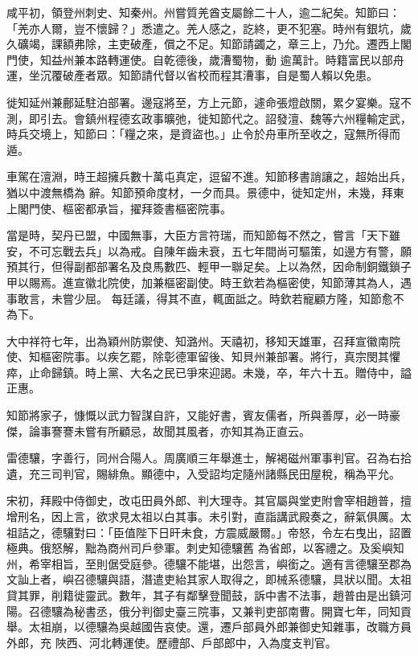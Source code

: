 \begin{pinyinscope}
 咸平初，領登州刺史、知秦州。州嘗質羌酋支屬餘二十人，逾二紀矣。知節曰：「羌亦人爾，豈不懷歸？」悉遣之。羌人感之，訖終，更不犯塞。時州有銀坑，歲久礦竭，課額弗除，主吏破產，償之不足。知節請蠲之，章三上，乃允。遷西上閣門使，知益州兼本路轉運使。自乾德後，歲漕蜀物，動
 逾萬計。時籍富民以部舟運，坐沉覆破產者眾。知節請代督以省校而程其漕事，自是蜀人賴以免患。



 徙知延州兼鄜延駐泊部署。邊寇將至，方上元節，遽命張燈啟關，累夕宴樂。寇不測，即引去。會鎮州程德玄政事曠弛，徙知節代之。詔發澶、魏等六州糧輸定武，時兵交境上，知節曰：「糧之來，是資盜也。」止令於舟車所至收之，寇無所得而遁。



 車駕在澶淵，時王超擁兵數十萬屯真定，逗留不進。知節移書誚讓之，超始出兵，猶以中渡無橋為
 辭。知節預命度材，一夕而具。景德中，徙知定州，未幾，拜東上閣門使、樞密都承旨，擢拜簽書樞密院事。



 當是時，契丹已盟，中國無事，大臣方言符瑞，而知節每不然之，嘗言「天下雖安，不可忘戰去兵」以為戒。自陳年齒未衰，五七年間尚可驅策，如邊方有警，願預其行，但得副都部署名及良馬數匹、輕甲一聯足矣。上以為然，因命制銅鐵鎖子甲以賜焉。進宣徽北院使，加兼樞密副使。時王欽若為樞密使，知節薄其為人，遇事敢言，未嘗少屈。
 每廷議，得其不直，輒面詆之。時欽若寵顧方隆，知節愈不為下。



 大中祥符七年，出為穎州防禦使、知潞州。天禧初，移知天雄軍，召拜宣徽南院使、知樞密院事。以疾乞罷，除彰德軍留後、知貝州兼部署。將行，真宗閔其懼瘁，止命歸鎮。時上黨、大名之民已爭來迎謁。未幾，卒，年六十五。贈侍中，謚正惠。



 知節將家子，慷慨以武力智謀自許，又能好書，賓友儒者，所與善厚，必一時豪傑，論事謇謇未嘗有所顧忌，故聞其風者，亦知其為正直云。



 雷德驤，字善行，同州合陽人。周廣順三年舉進士，解褐磁州軍事判官。召為右拾遺，充三司判官，賜緋魚。顯德中，入受詔均定隨州諸縣民田屋稅，稱為平允。



 宋初，拜殿中侍御史，改屯田員外郎、判大理寺。其官屬與堂吏附會宰相趙普，擅增刑名，因上言，欲求見太祖以白其事。未引對，直詣講武殿奏之，辭氣俱厲。太祖詰之，德驤對曰：「臣值陛下日旰未食，方震威嚴爾。」帝怒，令左右曳出，詔置極典。俄怒解，黜為商州司戶參軍。刺史知德驤舊
 為省郎，以客禮之。及奚嶼知州，希宰相旨，至則倨受庭參。德驤不能堪，出怨言，嶼銜之。適有言德驤至郡為文訕上者，嶼召德驤與語，潛遣吏紿其家人取得之，即械系德驤，具狀以聞。太祖貸其罪，削籍徙靈武。數年，其子有鄰擊登聞鼓，訴中書不法事，趙普由是出鎮河陽。召德驤為秘書丞，俄分判御史臺三院事，又兼判吏部南曹。開寶七年，同知貢舉。太祖崩，以德驤為吳越國告哀使。還，遷戶部員外郎兼御史知雜事，改職方員外郎，充
 陜西、河北轉運使。歷禮部、戶部郎中，入為度支判官。




\end{pinyinscope}
